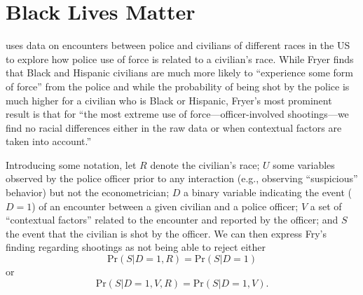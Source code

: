 \documentclass[12pt]{amsart}
\begin{document}
\section{Black Lives Matter}
\label{sec:orgb50b4b9}
\cite{fryer19} uses data on encounters between police and civilians
of different races in the US to explore how police use of force is
related to a civilian's race.  While Fryer finds that Black and
Hispanic civilians are much more likely to ``experience some form of
force'' from the police and while the probability of being shot by the police is
much higher for a civilian who is Black or Hispanic, Fryer's
most prominent result is that for ``the most extreme use of
force---officer-involved shootings---we find no racial differences
either in the raw data or when contextual factors are taken into
account.''  

Introducing some notation, let \(R\) denote the civilian's race; \(U\)
some variables observed by the police officer prior to any
interaction (e.g., observing ``suspicious'' behavior) but not the
econometrician; \(D\) a binary variable indicating the event (\(D=1\)) of an
encounter between a given civilian and a police officer; \(V\) a set
of ``contextual factors'' related to the encounter and reported by the
officer; and \(S\) the event that the civilian is shot by the officer.
We can then express Fry's finding regarding shootings as not being
able to reject either
\begin{equation}
\label{eq:fry1}
    \mbox{Pr}(S|D=1,R) = \mbox{Pr}(S|D=1)
\end{equation}
or
\begin{equation}
\label{eq:fry2}
    \mbox{Pr}(S|D=1,V,R) = \mbox{Pr}(S|D=1,V).
\end{equation}
\end{document}
